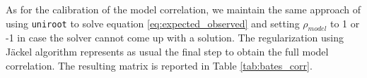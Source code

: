As for the calibration of the model correlation, we maintain the same approach of using \texttt{uniroot} to solve equation \eqref{eq:expected_observed} and setting $\rho_{model}$ to 1 or -1 in case the solver cannot come up with a solution.
The regularization using J\"ackel algorithm represents as usual the final step to obtain the full model correlation. The resulting matrix is reported in Table \ref{tab:bates_corr}.


\begin{table}  
	\tiny
	\centering
  
	\caption[Bates correlation matrix]{Resulting correlation matrix for Bates. Values are percentages and the colour scheme is the same used for the other correlation matrices.}
	\label{tab:bates_corr}
    
	\noindent{}
\end{table}
